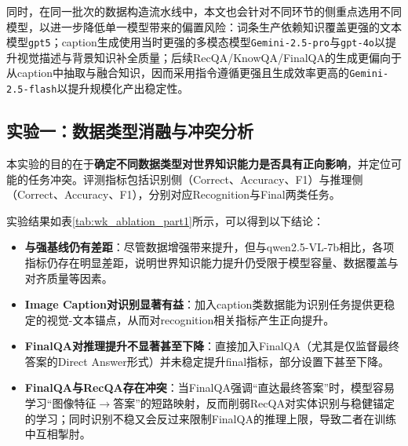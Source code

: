 同时，在同一批次的数据构造流水线中，本文也会针对不同环节的侧重点选用不同模型，以进一步降低单一模型带来的偏置风险：词条生产依赖知识覆盖更强的文本模型\texttt{gpt5}；caption生成使用当时更强的多模态模型\texttt{Gemini-2.5-pro}与\texttt{gpt-4o}以提升视觉描述与背景知识补全质量；后续RecQA/KnowQA/FinalQA的生成更偏向于从caption中抽取与融合知识，因而采用指令遵循更强且生成效率更高的\texttt{Gemini-2.5-flash}以提升规模化产出稳定性。

\subsection{实验一：数据类型消融与冲突分析}
本实验的目的在于\textbf{确定不同数据类型对世界知识能力是否具有正向影响}，并定位可能的任务冲突。评测指标包括识别侧（Correct、Accuracy、F1）与推理侧（Correct、Accuracy、F1），分别对应Recognition与Final两类任务。

实验结果如表\ref{tab:wk_ablation_part1}所示，可以得到以下结论：
\begin{itemize}
  \item \textbf{与强基线仍有差距}：尽管数据增强带来提升，但与qwen2.5-VL-7b相比\citep{bai2025qwen25vl}，各项指标仍存在明显差距，说明世界知识能力提升仍受限于模型容量、数据覆盖与对齐质量等因素。
  \item \textbf{Image Caption对识别显著有益}：加入caption类数据能为识别任务提供更稳定的视觉-文本锚点，从而对recognition相关指标产生正向提升。
  \item \textbf{FinalQA对推理提升不显著甚至下降}：直接加入FinalQA（尤其是仅监督最终答案的Direct Answer形式）并未稳定提升final指标，部分设置下甚至下降。
  \item \textbf{FinalQA与RecQA存在冲突}：当FinalQA强调“直达最终答案”时，模型容易学习“图像特征$\rightarrow$答案”的短路映射，反而削弱RecQA对实体识别与稳健锚定的学习；同时识别不稳又会反过来限制FinalQA的推理上限，导致二者在训练中互相掣肘。
\end{itemize}

